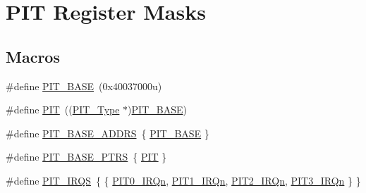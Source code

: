 \hypertarget{group___p_i_t___register___masks}{}\section{P\+IT Register Masks}
\label{group___p_i_t___register___masks}
\subsection*{Macros}
\begin{DoxyCompactItemize}
\item 
\#define \mbox{\hyperlink{group___p_i_t___register___masks_gaf00b86ba33a2cfe7bb100b4f01905f41}{P\+I\+T\+\_\+\+B\+A\+SE}}~(0x40037000u)
\item 
\#define \mbox{\hyperlink{group___p_i_t___register___masks_gaf181c9e6602b6432a0bf1a9243808968}{P\+IT}}~((\mbox{\hyperlink{struct_p_i_t___type}{P\+I\+T\+\_\+\+Type}} $\ast$)\mbox{\hyperlink{group___p_i_t___register___masks_gaf00b86ba33a2cfe7bb100b4f01905f41}{P\+I\+T\+\_\+\+B\+A\+SE}})
\item 
\#define \mbox{\hyperlink{group___p_i_t___register___masks_ga79085fa95893e4423661373b7be2f0a7}{P\+I\+T\+\_\+\+B\+A\+S\+E\+\_\+\+A\+D\+D\+RS}}~\{ \mbox{\hyperlink{group___p_i_t___register___masks_gaf00b86ba33a2cfe7bb100b4f01905f41}{P\+I\+T\+\_\+\+B\+A\+SE}} \}
\item 
\#define \mbox{\hyperlink{group___p_i_t___register___masks_ga403e0ed71b80cfe3e085fe6b56b5eff0}{P\+I\+T\+\_\+\+B\+A\+S\+E\+\_\+\+P\+T\+RS}}~\{ \mbox{\hyperlink{group___p_i_t___register___masks_gaf181c9e6602b6432a0bf1a9243808968}{P\+IT}} \}
\item 
\#define \mbox{\hyperlink{group___p_i_t___register___masks_ga5f0ae6317a2c8c12e46e49c6e2e29dda}{P\+I\+T\+\_\+\+I\+R\+QS}}~\{ \{ \mbox{\hyperlink{group___interrupt__vector__numbers_gga666eb0caeb12ec0e281415592ae89083ab3bc681f165a0965ac922a33bcc466c3}{P\+I\+T0\+\_\+\+I\+R\+Qn}}, \mbox{\hyperlink{group___interrupt__vector__numbers_gga666eb0caeb12ec0e281415592ae89083aebde56c1a0c87a74c43fc8b35309d429}{P\+I\+T1\+\_\+\+I\+R\+Qn}}, \mbox{\hyperlink{group___interrupt__vector__numbers_gga666eb0caeb12ec0e281415592ae89083afdef24d623050c63c2c35eb54dd35caf}{P\+I\+T2\+\_\+\+I\+R\+Qn}}, \mbox{\hyperlink{group___interrupt__vector__numbers_gga666eb0caeb12ec0e281415592ae89083aa6195cc174d28b297fe7652bf1663311}{P\+I\+T3\+\_\+\+I\+R\+Qn}} \} \}
\end{DoxyCompactItemize}
